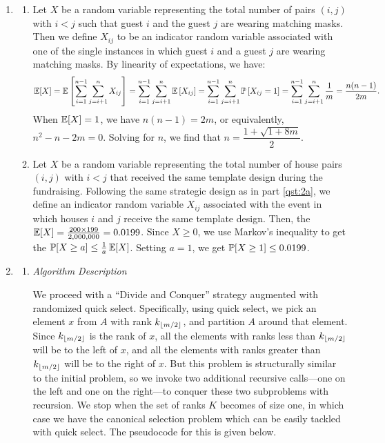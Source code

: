 \documentclass{article}
\begin{document}
\begin{enumerate}[leftmargin={*}, font={\bf}, label={\arabic*.}, ref={\arabic*}]
  \item \label{qst:2}
    \begin{enumerate}[ref={(\alph*)}]
      \item \label{qst:2a}
        Let $X$ be a random variable representing the total number of pairs $(i, j)$ with $i < j$
        such that guest $i$ and the guest $j$ are wearing matching masks. Then we define $X_{ij}$
        to be an indicator random variable associated with one of the single instances in which
        guest $i$ and a guest $j$ are wearing matching masks. By linearity of expectations, we have:
        \[
          \E[X] = \E\left[\sum_{i=1}^{n-1} \sum_{j=i+1}^{n} X_{ij}\right]
                = \sum_{i=1}^{n-1} \sum_{j=i+1}^{n} \E\left[X_{ij}\right]
                = \sum_{i=1}^{n-1} \sum_{j=i+1}^{n} \P\left[X_{ij} = 1\right]
                = \sum_{i=1}^{n-1} \sum_{j=i+1}^{n} \frac{1}{m} 
                = \frac{n(n-1)}{2m}.
       \]
        When $\E[X] = 1$, we have $n(n-1) = 2m$, or equivalently, $n^2 - n - 2m = 0$. Solving for
        $n$, we find that $n = \dfrac{1 + \sqrt{1+8m}}{2}$.

      \item \label{qst:2b}
        Let $X$ be a random variable representing the total number of house pairs $(i,j)$ with $i
        < j$ that received the same template design during the fundraising. Following the same
        strategic design as in part \ref{qst:2a}, we define an indicator random variable $X_{ij}$
        associated with the event in which houses $i$ and $j$ receive the same template design.
        Then, the $\E[X] = \frac{200 \times 199}{2,000,000} = 0.0199$. Since $X \geq 0$, we use
        Markov's inequality to get the $\P[X \geq a] \leq \frac{1}{a}\E[X]$. Setting $a = 1$, we
        get $\P[X \geq 1] \leq 0.0199$.
    \end{enumerate}

  \item \label{qst:3}
    \begin{enumerate}
      \item \label{qst:3a}
        {\itshape Algorithm Description}

        We proceed with a ``Divide and Conquer'' strategy augmented with randomized quick select.
        Specifically, using quick select, we pick an element $x$ from $A$ with rank $k_{\floor{m/2}}$,
        and partition $A$ around that element. Since $k_{\floor{m/2}}$ is the rank of $x$, all the
        elements with ranks less than $k_{\floor{m/2}}$ will be to the left of $x$, and all the
        elements with ranks greater than $k_{\floor{m/2}}$ will be to the right of $x$. But this
        problem is structurally similar to the initial problem, so we invoke two additional recursive
        calls---one on the left and one on the right---to conquer these two subproblems with recursion.
        We stop when the set of ranks $K$ becomes of size one, in which case we have the canonical
        selection problem which can be easily tackled with quick select. The pseudocode for this is
        given below.


\end{enumerate}
\end{enumerate}
\end{document}
